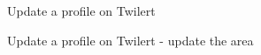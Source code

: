 \documentclass[letterpaper,11pt]{article}
\begin{document}
\begin{figure}[H]
	\centering
	\caption{Update a profile on Twilert}
	\label{fig:10_6_twilert_input_edit}
\end{figure}

\begin{figure}[H]
	\centering
	\caption{Update a profile on Twilert - update the area}
	\label{fig:10_6_twilert_area2}
\end{figure}
\end{document}
